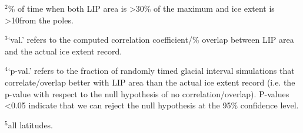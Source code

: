 \begin{table}[h!]
\begin{tablenotes}
$^{2}$\% of time when both LIP area is \textgreater30\% of the maximum and ice extent is \textgreater10\degrees from the poles.
\vspace{0.15cm}

$^{3}$`val.' refers to the computed correlation coefficient/\% overlap between LIP area and the actual ice extent record.
\vspace{0.15cm}

$^{4}$`p-val.' refers to the fraction of randomly timed glacial interval simulations that correlate/overlap better with LIP area than the actual ice extent record (i.e. the p-value with respect to the null hypothesis of no correlation/overlap). P-values \textless0.05 indicate that we can reject the null hypothesis at the 95\% confidence level.
\vspace{0.15cm}

$^{5}$all latitudes.
\end{tablenotes}
\label{tab:stats}
\end{table}

